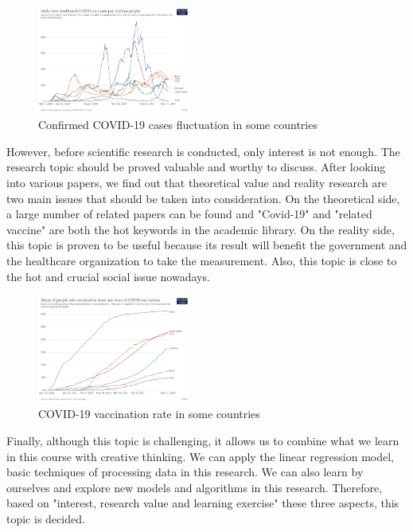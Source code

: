 \documentclass{article}
\begin{document}
\begin{multicols}{2}
\begin{figure}[H]
    \centering
    \includegraphics[width=0.45\textwidth]{newconfirmedpermillion.png}
    \caption{Confirmed COVID-19 cases fluctuation in some countries}
    \label{fig:graph2}
\end{figure}

However, before scientific research is conducted, only interest is not enough. The research topic should be proved valuable and worthy to discuss. After looking into various papers, we find out that theoretical value and reality research are two main issues that should be taken into consideration. On the theoretical side, a large number of related papers can be found and "Covid-19" and "related vaccine" are both the hot keywords in the academic library. On the reality side, this topic is proven to be useful because its result will benefit the government and the healthcare organization to take the measurement. Also, this topic is close to the hot and crucial social issue nowadays.

\begin{figure}[H]
    \centering
    \includegraphics[width=0.45\textwidth]{vaccinepermillion.png}
    \caption{COVID-19 vaccination rate in some countries}
    \label{fig:graph3}
\end{figure}

Finally, although this topic is challenging, it allows us to combine what we learn in this course with creative thinking. We can apply the linear regression model, basic techniques of processing data in this research. We can also learn by ourselves and explore new models and algorithms in this research. Therefore, based on "interest, research value and learning exercise" these three aspects, this topic is decided.


\end{multicols}
\end{document}
